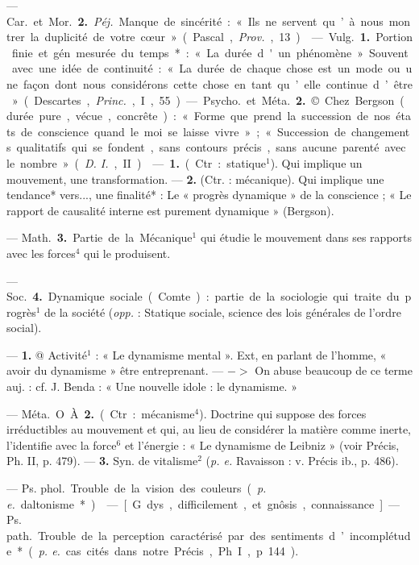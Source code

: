\begin{itemize}[leftmargin=1cm, label=, itemsep=1pt]
— \si{Car.} et \si{Mor.} {\bf 2.} {\it Péj.} Manque de
sincérité : « Ils ne servent qu’à nous
montrer la duplicité de votre cœur »
(Pascal, {\it Prov.}, 13).

 — \si{Vulg.} {\bf 1.} Portion finie et gén.
mesurée du temps* : « La durée
d'un phénomène ». Souvent avec
une idée de continuité : « La durée
de chaque chose est un mode ou une
façon dont nous considérons cette
chose en tant qu’elle continue d’être»
(Descartes, {\it Princ.}, I, 55).

— \si{Psycho.} et \si{Méta.} {\bf 2.} © Chez
Bergson (durée pure, vécue, concrête) : « Forme que prend la succession de nos états de conscience
quand le moi se laisse vivre »; « Succession de changements qualitatifs
qui se fondent, sans contours précis,... sans aucune parenté avec le
nombre » ({\it D. I.}, II).

 — {\bf 1.} (Ctr. : statique$^1$). Qui implique un mouvement, une transformation. — {\bf 2.}
(Ctr. : mécanique). Qui implique une
tendance* vers..., une finalité* : Le
« progrès dynamique » de la conscience ; « Le rapport de causalité
interne est purement dynamique »
(Bergson).

 — \si{Math.} {\bf 3.} Partie
de la Mécanique$^1$ qui étudie le mouvement dans ses rapports avec les
forces$^4$ qui le produisent.

— \si{Soc.} {\bf 4.} Dynamique sociale
(Comte) : partie de la sociologie qui
traite du progrès$^1$ de la société ({\it opp.} :
Statique sociale, science des lois
générales de l’ordre social).

 — {\bf 1.} @ Activité$^1$ : « Le
dynamisme mental ». Ext, en parlant de l’homme, « avoir du dynamisme » être entreprenant. —
$->$ On abuse beaucoup de ce terme
auj. : cf. J. Benda : « Une nouvelle
idole : le dynamisme. »

— \si{Méta.} O À {\bf 2.} (Ctr. : mécanisme$^4$). Doctrine qui suppose des
forces irréductibles au mouvement
et qui, au lieu de considérer la
matière comme inerte, l'identifie
avec la force$^6$ et l'énergie : « Le
dynamisme de Leibniz » (voir Précis,
Ph. II, p. 479). — {\bf 3.} Syn. de vitalisme$^2$ ({\it p. e.} Ravaisson : v. Précis
ib., p. 486).

 — \si{Ps. phol.} Trouble
de la vision des couleurs ({\it p. e.} daltonisme*).

 — [G. dys, difficilement, et
gnôsis, connaissance] — \si{Ps. path.}
Trouble de la perception caractérisé 
par des sentiments d’incomplétude*
({\it p. e.} cas cités dans notre Précis,
Ph. I, p. 144).

	\end{itemize}
